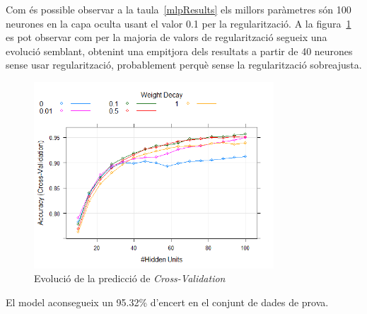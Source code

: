 Com és possible observar a la taula~\ref{mlpResults} els millors paràmetres són 100 neurones en la capa oculta usant el valor 0.1 per la regularització. A la figura~\ref{fig:mlpVal} es pot observar com per la majoria de valors de regularització segueix una evolució semblant, obtenint una empitjora dels resultats a partir de 40 neurones sense usar regularització, probablement perquè sense la regularització sobreajusta.

\begin{figure}[H]
    \centering
    \includegraphics[width=0.8\textwidth]{img/cvMLP.png}
    \caption{Evolució de la predicció de \textit{Cross-Validation}}
    \label{fig:mlpVal}
\end{figure} 

El model aconsegueix un 95.32\% d'encert en el conjunt de dades de prova.

